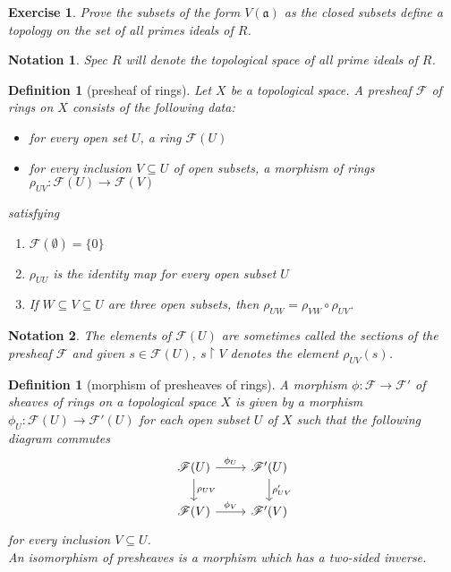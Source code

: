 \documentclass[12pt]{article}
\newtheorem{definition}[proposition]{Definition}
\newtheorem{ex}[proposition]{Exercise}
\newtheorem{notation}{Notation}
\begin{document}
\begin{ex}
	Prove the subsets of the form $V(\mathfrak{a})$ as the closed subsets define a topology on the set of all primes ideals of $R$. 
\end{ex}

\begin{notation}
	Spec $R$ will denote the topological space of all prime ideals of $R$.
\end{notation}

\begin{definition}[presheaf of rings]
	Let $X$ be a topological space. A presheaf $\mathscr{F}$ of rings on $X$ consists of the following data:
	\begin{itemize}
		\item for every open set $U$, a ring $\mathscr{F}(U)$
		\item for every inclusion $V \subseteq U$ of open subsets, a morphism of rings $\rho_{UV}: \mathscr{F}(U) \rightarrow \mathscr{F}(V)$  
	\end{itemize}
satisfying 
	\begin{enumerate}
		\item $\mathscr{F}(\emptyset) = \lbrace 0 \rbrace$
		\item $\rho_{UU}$ is the identity map for every open subset $U$
		\item  If $W \subseteq V \subseteq U$ are three open subsets, then $\rho_{UW} = \rho_{VW} \circ \rho_{UV}$.
	\end{enumerate}
\end{definition}

\begin{notation}
	The elements of $\mathscr{F}(U)$ are sometimes called the sections of the presheaf $\mathscr{F}$ and given $s \in \mathscr{F}(U)$, $s\restriction V$ denotes the element $\rho_{UV}(s)$.
\end{notation}

\begin{definition}[morphism of presheaves of rings]
	A morphism $\phi: \mathscr{F} \rightarrow \mathscr{F}'$ of sheaves of rings on a topological space $X$ is given by a morphism $\phi_U: \mathscr{F}(U) \rightarrow \mathscr{F}'(U)$ for each open subset $U$ of $X$ such that  the following diagram commutes
	\[
	\begin{tikzcd}
	\mathscr{F}(U) \arrow[r, "\phi_U"] \arrow[d, "\rho_{UV}"] & \mathscr{F}'(U) \arrow[d, "\rho'_{UV}"] \\
	\mathscr{F}(V) \arrow[r, "\phi_V"] & \mathscr{F}'(V) 
	\end{tikzcd}
	\]
	for every inclusion $V \subseteq U$. \\
	An isomorphism of presheaves is a morphism which has a two-sided inverse.
\end{definition}		
\end{document}

